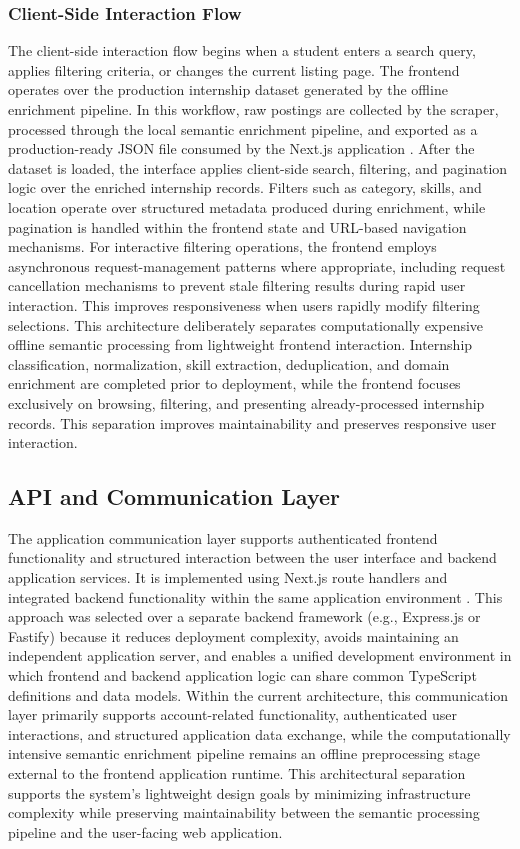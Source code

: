 \subsubsection*{Client-Side Interaction Flow}
The client-side interaction flow begins when a student enters a search query, applies filtering criteria, or changes the current listing page. The frontend operates over the production internship dataset generated by the offline enrichment pipeline. In this workflow, raw postings are collected by the scraper, processed through the local semantic enrichment pipeline, and exported as a production-ready JSON file consumed by the Next.js application \cite{kleppmann2017designing, bass2012software}.
After the dataset is loaded, the interface applies client-side search, filtering, and pagination logic over the enriched internship records. Filters such as category, skills, and location operate over structured metadata produced during enrichment, while pagination is handled within the frontend state and URL-based navigation mechanisms.
For interactive filtering operations, the frontend employs asynchronous request-management patterns where appropriate, including request cancellation mechanisms to prevent stale filtering results during rapid user interaction. This improves responsiveness when users rapidly modify filtering selections.
This architecture deliberately separates computationally expensive offline semantic processing from lightweight frontend interaction. Internship classification, normalization, skill extraction, deduplication, and domain enrichment are completed prior to deployment, while the frontend focuses exclusively on browsing, filtering, and presenting already-processed internship records. This separation improves maintainability and preserves responsive user interaction.

\subsection{API and Communication Layer}
The application communication layer supports authenticated frontend functionality and structured interaction between the user interface and backend application services. It is implemented using Next.js route handlers and integrated backend functionality within the same application environment \cite{fielding2002principled, bass2012software}.
This approach was selected over a separate backend framework (e.g., Express.js or Fastify) because it reduces deployment complexity, avoids maintaining an independent application server, and enables a unified development environment in which frontend and backend application logic can share common TypeScript definitions and data models.
Within the current architecture, this communication layer primarily supports account-related functionality, authenticated user interactions, and structured application data exchange, while the computationally intensive semantic enrichment pipeline remains an offline preprocessing stage external to the frontend application runtime.
This architectural separation supports the system's lightweight design goals by minimizing infrastructure complexity while preserving maintainability between the semantic processing pipeline and the user-facing web application.
